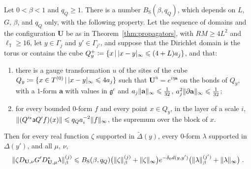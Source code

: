 \documentclass[11pt]{preprint}
\DeclarePairedDelimiter{\abs}{\lvert}{\rvert}
\DeclarePairedDelimiter{\norm}{\lVert}{\rVert}
\numberwithin{equation}{section}
\begin{document}
\begin{proposition}\label{prop:schauder}
Let $0 < \beta < 1$ and $q_Q \geqslant 1$. There is a number $B_{\mathrm S}(\beta, q_Q)$, which depends on $L$, $G$, $\beta$, and $q_Q$ only, with the following property. Let the sequence of domains and the configuration $\mathbf U$ be as in Theorem~\ref{thm:propagators}, with $RM \geqslant 4L^2$ and $\ell_{\mathbb T} \geqslant 16$, let $y \in \Gamma_j$ and $y' \in \Gamma_{j'}$, and suppose that the Dirichlet domain is the torus or contains the cube $Q^+_y \coloneqq \{ x \,|\, \abs{x - y}_\infty \leqslant (4 + L)a_j \}$, and that:
\begin{enumerate}[label=(\alph*)]
\item there is a gauge transformation $u$ of the sites of the cube $Q_y \coloneqq \{ x \in T^{(0)} \,|\, \abs{x - y}_\infty \leqslant 4a_j \}$ such that $\mathbf U^u = e^{i\eta\mathbf a}$ on the bonds of $Q_y$, with a $1$-form $\mathbf a$ with values in $\mathfrak g^c$ and $a_j\norm{\mathbf a}_\infty \leqslant \frac{1}{32}$, $a_j^2\norm{\partial\mathbf a}_\infty \leqslant \frac{1}{32}$;
\item for every bounded $0$-form $f$ and every point $x \in Q_y$, in the layer of a scale $i$, $\norm{(Q'^*\mathsf aQ'f)(x)} \leqslant q_Qa_i^{-2}\norm f_\infty$, the supremum over the block of $x$.
\end{enumerate}
Then for every real function $\zeta$ supported in $\tilde\Delta(y)$, every $0$-form $\lambda$ supported in $\Delta(y')$, and all $\mu$, $\nu$,
\begin{equation}\label{eq:schauder}
    \norm{\zeta D_{\mathbf U,\nu}G'D^*_{\mathbf U,\mu}\lambda}^{(j)}_\beta \leqslant B_{\mathrm S}(\beta, q_Q)\bigl(\norm\zeta^{(j)}_\beta + \norm\zeta_\infty\bigr)e^{-\delta_0d(y, y')}\bigl(\norm\lambda^{(j')}_\beta + \norm\lambda_\infty\bigr)\;.
\end{equation}
\end{proposition}
\end{document}

